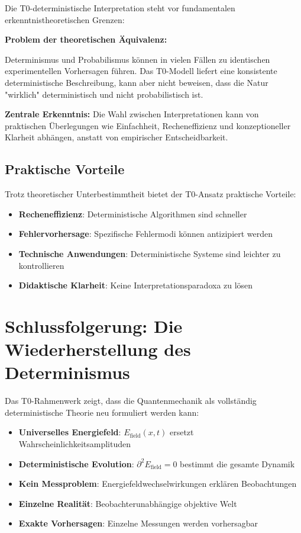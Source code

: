 \documentclass[12pt,a4paper]{report}
\begin{document}
	Die T0-deterministische Interpretation steht vor fundamentalen erkenntnistheoretischen Grenzen:
	
	\begin{tcolorbox}[colback=yellow!5!white,colframe=orange!75!black,title=Erkenntnistheoretischer Vorbehalt]
		\textbf{Problem der theoretischen Äquivalenz:}
		
		Determinismus und Probabilismus können in vielen Fällen zu identischen experimentellen Vorhersagen führen. Das T0-Modell liefert eine konsistente deterministische Beschreibung, kann aber nicht beweisen, dass die Natur "wirklich" deterministisch und nicht probabilistisch ist.
		
		\textbf{Zentrale Erkenntnis:} Die Wahl zwischen Interpretationen kann von praktischen Überlegungen wie Einfachheit, Recheneffizienz und konzeptioneller Klarheit abhängen, anstatt von empirischer Entscheidbarkeit.
	\end{tcolorbox}
	
	
	\subsection{Praktische Vorteile}
	\label{subsec:practical_advantages}
	
	Trotz theoretischer Unterbestimmtheit bietet der T0-Ansatz praktische Vorteile:
	
	\begin{itemize}
		\item \textbf{Recheneffizienz}: Deterministische Algorithmen sind schneller
		\item \textbf{Fehlervorhersage}: Spezifische Fehlermodi können antizipiert werden
		\item \textbf{Technische Anwendungen}: Deterministische Systeme sind leichter zu kontrollieren
		\item \textbf{Didaktische Klarheit}: Keine Interpretationsparadoxa zu lösen
	\end{itemize}
	
	\section{Schlussfolgerung: Die Wiederherstellung des Determinismus}
	\label{sec:conclusion_determinism}
	
	Das T0-Rahmenwerk zeigt, dass die Quantenmechanik als vollständig deterministische Theorie neu formuliert werden kann:
	
	\begin{itemize}
		\item \textbf{Universelles Energiefeld}: $E_{\text{field}}(x,t)$ ersetzt Wahrscheinlichkeitsamplituden
		\item \textbf{Deterministische Evolution}: $\partial^2 E_{\text{field}} = 0$ bestimmt die gesamte Dynamik
		\item \textbf{Kein Messproblem}: Energiefeldwechselwirkungen erklären Beobachtungen
		\item \textbf{Einzelne Realität}: Beobachterunabhängige objektive Welt
		\item \textbf{Exakte Vorhersagen}: Einzelne Messungen werden vorhersagbar
	\end{itemize}
	
\end{document}
